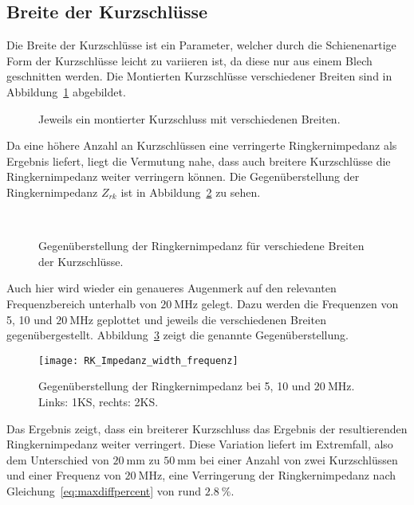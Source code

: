 \subsection{Breite der Kurzschl\"usse}
Die Breite der Kurzschl\"usse ist ein Parameter, welcher durch die Schienenartige Form der Kurzschl\"usse leicht zu variieren ist, da diese nur aus einem Blech geschnitten werden. Die Montierten Kurzschl\"usse verschiedener Breiten sind in Abbildung~\ref{fig:ringcorewidthCST} abgebildet.
\begin{figure}[htb]
	\centering
	\hspace{0.02\textwidth}
	\hspace{0.02\textwidth}
	\caption{Jeweils ein montierter Kurzschluss mit verschiedenen Breiten.}
	\label{fig:ringcorewidthCST}
\end{figure}
\par
Da eine h\"ohere Anzahl an Kurzschl\"ussen eine verringerte Ringkernimpedanz als Ergebnis liefert, liegt die Vermutung nahe, dass auch breitere Kurzschl\"usse die Ringkernimpedanz weiter verringern k\"onnen. Die Gegen\"uberstellung der Ringkernimpedanz $Z_{rk}$ ist in Abbildung~\ref{fig:ringcorewidth} zu sehen.
\begin{figure}[htb]
	\centering
	\\
	\caption{Gegen\"uberstellung der Ringkernimpedanz f\"ur verschiedene Breiten der Kurzschl\"usse.}
	\label{fig:ringcorewidth}
\end{figure}
\par
Auch hier wird wieder ein genaueres Augenmerk auf den relevanten Frequenzbereich unterhalb von $\SI{20}{\mega\hertz}$ gelegt. Dazu werden die Frequenzen von 5, 10 und $\SI{20}{\mega\hertz}$ geplottet und jeweils die verschiedenen Breiten gegen\"ubergestellt. Abbildung~\ref{fig:ringcorewidth20} zeigt die genannte Gegen\"uberstellung.
\begin{figure}[htb]
	\centering
	\texttt{[image: RK\_Impedanz\_width\_frequenz]}
	\caption{Gegen\"uberstellung der Ringkernimpedanz bei 5, 10 und $\SI{20}{\mega\hertz}$. Links: 1KS, rechts: 2KS.}
	\label{fig:ringcorewidth20}
\end{figure}
\par
Das Ergebnis zeigt, dass ein breiterer Kurzschluss das Ergebnis der resultierenden Ringkernimpedanz weiter verringert. Diese Variation liefert im Extremfall, also dem Unterschied von $\SI{20}{\milli\meter}$ zu $\SI{50}{\milli\meter}$ bei einer Anzahl von zwei Kurzschl\"ussen und einer Frequenz von $\SI{20}{\mega\hertz}$, eine Verringerung der Ringkernimpedanz nach Gleichung~\ref{eq:maxdiffpercent} von rund $\SI{2,8}{\%}$.


